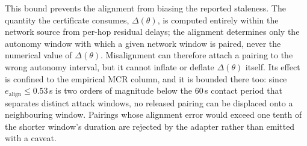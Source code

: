 This bound prevents the alignment from biasing the reported staleness. The
quantity the certificate consumes, $\Delta(\theta)$, is computed entirely within
the network source from per-hop residual delays; the alignment determines only
the autonomy window with which a given network window is paired, never the
numerical value of $\Delta(\theta)$. Misalignment can therefore attach a pairing
to the wrong autonomy interval, but it cannot inflate or deflate $\Delta(\theta)$
itself. Its effect is confined to the empirical MCR column, and it is bounded
there too: since $e_{\mathrm{align}}\le0.53$\,s is two orders of magnitude
below the $60$\,s contact period that separates distinct attack windows, no
released pairing can be displaced onto a neighbouring window. Pairings whose
alignment error would exceed one tenth of the shorter window's duration are
rejected by the adapter rather than emitted with a caveat.

